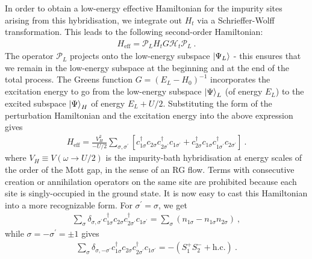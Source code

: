 \documentclass[reprint,hidelinks,onecolumn]{revtex4-2}
\begin{document}
In order to obtain a low-energy effective Hamiltonian for the impurity sites arising from this hybridisation, we integrate out \(H_t\) via a Schrieffer-Wolff transformation. This leads to the following second-order Hamiltonian:
\begin{equation}\begin{aligned}
	H_\text{eff} = \mathcal{P}_L H_t G\mathcal H_t \mathcal{P}_L~.
\end{aligned}\end{equation}
The operator \(\mathcal{P}_L\) projects onto the low-energy subspace \(\ket{\Psi_L}\) - this ensures that we remain in the low-energy subspace at the beginning and at the end of the total process. The Greens function \(G = (E_L - H_0)^{-1}\) incorporates the excitation energy to go from the low-energy subspace \(\ket{\Psi}_L\) (of energy \(E_L\)) to the excited subspace \(\ket{\Psi}_H\) of energy \(E_L + U/2\). Substituting the form of the perturbation Hamiltonian and the excitation energy into the above expression gives
\begin{equation}\begin{aligned}\label{effHam1}
	H_\text{eff} = \frac{V_H^2}{-U/2}\sum_{\sigma,\sigma^\prime} \left[c^\dagger_{1\sigma}c_{2\sigma}c^\dagger_{2\sigma^\prime}c_{1\sigma^\prime} + c^\dagger_{2\sigma}c_{1\sigma}c^\dagger_{1\sigma^\prime}c_{2\sigma^\prime}\right] ~.
\end{aligned}\end{equation}
where \(V_H \equiv V(\omega \to U/2)\) is the impurity-bath hybridisation at energy scales of the order of the Mott gap, in the sense of an RG flow. Terms with consecutive creation or annihilation operators on the same site are prohibited because each site is singly-occupied in the ground state. It is now easy to cast this Hamiltonian into a more recognizable form. For \(\sigma^\prime=\sigma\), we get
\begin{equation}\begin{aligned}
	\sum_{\sigma}\delta_{\sigma,\sigma^\prime}c^\dagger_{1\sigma}c_{2\sigma}c^\dagger_{2\sigma^\prime}c_{1\sigma^\prime} = \sum_\sigma \left(n_{1\sigma} - n_{1\sigma}n_{2\sigma}\right) ~,
\end{aligned}\end{equation}
while \(\sigma=-\sigma^\prime=\pm 1\) gives 
\begin{equation}\begin{aligned}
	\sum_{\sigma}\delta_{\sigma,-\sigma^\prime}c^\dagger_{1\sigma}c_{2\sigma}c^\dagger_{2\sigma^\prime}c_{1\sigma^\prime} = -\left(S_1^+ S_2^- + \text{h.c.}\right)~.
\end{aligned}\end{equation}
\end{document}
